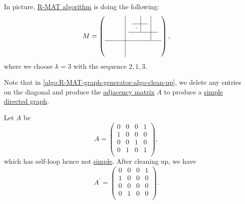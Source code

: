 \begin{eg}
	In picture, \hyperref[algo:R-MAT-graph-generator-algo]{R-MAT algorithm} is doing the following:
	\[
		M = \left(
		\begin{array}{c|c}
				\begin{array}{cc}
					 & \\
					 &
				\end{array} & \begin{array}{c|c}
					              \begin{array}{c|c}
						      & \\
						\hline
						\cdot &
					\end{array} &    \\
					              \hline
					                                 &
				              \end{array} \\
				\hline
				\begin{array}{cc}
					 & \\
					 &
				\end{array} & \begin{array}{cc}
					               & \\
					               &
				              \end{array}
			\end{array}
		\right),
	\]
	where we choose \(k = 3\) with the sequence \(2, 1, 3\).
\end{eg}

Note that in \autoref{algo:R-MAT-graph-generator-algo-clean-up}, we delete any entries on the diagonal and produce the \hyperref[def:adjacency-matrix]{adjacency matrix}
\(A\) to produce a \hyperref[def:simple-graph]{simple} \hyperref[def:directed-graph]{directed graph}.
\begin{eg}[Clean up]
	Let \(A\) be
	\[
		A = \begin{pmatrix}
			0 & 0 & 0 & 1 \\
			1 & 0 & 0 & 0 \\
			0 & 0 & 1 & 0 \\
			0 & 1 & 0 & 1 \\
		\end{pmatrix},
	\]
	which has self-loop hence not \hyperref[def:simple-graph]{simple}. After cleaning up, we have
	\[
		A^\prime = \begin{pmatrix}
			0 & 0 & 0 & 1 \\
			1 & 0 & 0 & 0 \\
			0 & 0 & 0 & 0 \\
			0 & 1 & 0 & 0 \\
		\end{pmatrix}.
	\]
\end{eg}

